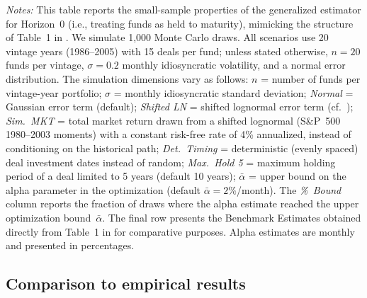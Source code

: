 \begin{table}[htbp]
{\begin{tabular}{l ccccc cccccc}
			\bottomrule
		\end{tabular}%
	}
	\begin{minipage}{\linewidth}
		\vspace{0.2cm}
		\footnotesize \textit{Notes:} 
		This table reports the small-sample properties of the generalized estimator for Horizon~0 (i.e., treating funds as held to maturity), mimicking the structure of Table~1 in \cite{DLP12}. We simulate 1,000 Monte Carlo draws. All scenarios use 20 vintage years (1986--2005) with 15 deals per fund; unless stated otherwise, $n=20$ funds per vintage, $\sigma=0.2$ monthly idiosyncratic volatility, and a normal error distribution. The simulation dimensions vary as follows: $n$ = number of funds per vintage-year portfolio; $\sigma$ = monthly idiosyncratic standard deviation; \textit{Normal} = Gaussian error term (default); \textit{Shifted LN} = shifted lognormal error term (cf.\ \cite{DLP12}); \textit{Sim.~MKT} = total market return drawn from a shifted lognormal (S\&P~500 1980--2003 moments) with a constant risk-free rate of 4\% annualized, instead of conditioning on the historical path; \textit{Det.~Timing} = deterministic (evenly spaced) deal investment dates instead of random; \textit{Max.~Hold 5} = maximum holding period of a deal limited to 5 years (default 10 years); $\bar{\alpha}$ = upper bound on the alpha parameter in the optimization (default $\bar{\alpha} = 2\%$/month). The \textit{\%~Bound} column reports the fraction of draws where the alpha estimate reached the upper optimization bound~$\bar{\alpha}$. The final row presents the Benchmark Estimates obtained directly from Table~1 in \cite{DLP12} for comparative purposes. Alpha estimates are monthly and presented in percentages.
	\end{minipage}
\end{table}





\subsection{Comparison to empirical results}


